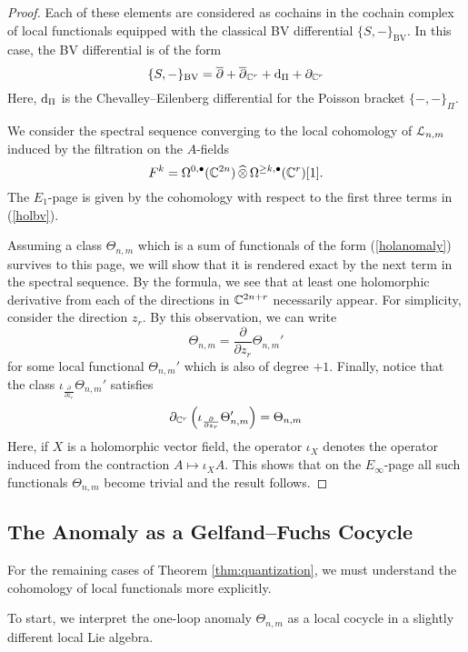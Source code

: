 \documentclass[11pt, oneside, reqno]{amsart}
\theoremstyle{definition} \newtheorem{definition}{Definition}[section]
\theoremstyle{definition}
\theoremstyle{remark}
\theoremstyle{definition} \newtheorem{remark}[definition]{Remark}
\theoremstyle{definition} \newtheorem{remarks}[definition]{Remarks}
\theoremstyle{definition} \newtheorem{question}[definition]{Question}
\theoremstyle{definition} \newtheorem*{note}{Note}
\theoremstyle{definition} \newtheorem{example}[definition]{Example}
\theoremstyle{definition} \newtheorem{examples}[definition]{Examples}
\def\bu{\bullet}
\def\Hat{\widehat}
\newcommand{\dbar}{\overline{\partial}}
\newcommand{\mr}[1]{\mathrm{#1}}
\def\d{{\rm d}}
\begin{document}
\begin{proof}
Each of these elements are considered as cochains in the cochain complex of local functionals equipped with the classical BV differential $\{S,-\}_{\mr{BV}}$.
In this case, the BV differential is of the form
\begin{equation}\label{holbv}
\{S, -\}_{\mr{BV}} = \dbar + \dbar_{\CC^{r}} + \d_{\Pi} + \partial_{\CC^{r}}
\end{equation}
Here, $\d_{\Pi}$ is the Chevalley--Eilenberg differential for the Poisson bracket $\{-,-\}_\Pi$.

We consider the spectral sequence converging to the local cohomology of $\mathcal L_{n,m}$ induced by the filtration on the $A$-fields
\[
F^k = \Omega^{0,\bu} (\CC^{2n}) \, \Hat{\otimes} \, \Omega^{\geq k, \bu} (\CC^{r}) [1] .
\]
The $E_1$-page is given by the cohomology with respect to the first three terms in (\ref{holbv}). 

Assuming a class $\Theta_{n,m}$ which is a sum of functionals of the form (\ref{holanomaly}) survives to this page, we will show that it is rendered exact by the next term in the spectral sequence. 
By the formula, we see that at least one holomorphic derivative from each of the directions in $\mathbb C^{2n + r}$ necessarily appear. 
For simplicity, consider the direction $z_{r}$.
By this observation, we can write
\[
\Theta_{n,m} = \frac{\partial}{\partial z_{{r}}} \Theta_{n,m}'
\]
for some local functional $\Theta_{n,m}'$ which is also of degree $+1$.
Finally, notice that the class $\iota_{\frac{\partial}{\partial z_{r}}} \Theta_{n,m}'$ satisfies
\[
\partial_{\mathbb C^{r}} \left(\iota_{\frac{\partial}{\partial z_{r}}} \Theta_{n,m}'\right) = \Theta_{n,m}
\]
Here, if $X$ is a holomorphic vector field, the operator $\iota_{X}$ denotes the operator induced from the contraction $A \mapsto \iota_X A$. 
This shows that on the $E_\infty$-page all such functionals $\Theta_{n,m}$ become trivial and the result follows.
\end{proof}

\subsection{The Anomaly as a Gelfand--Fuchs Cocycle}

For the remaining cases of Theorem \ref{thm:quantization}, we must understand the cohomology of local functionals more explicitly. 

To start, we interpret the one-loop anomaly $\Theta_{n,m}$ as a local cocycle in a slightly different local Lie algebra. 
\end{document}
